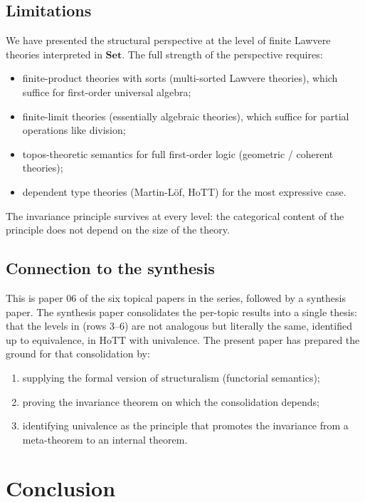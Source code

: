 \documentclass[12pt]{article}
\theoremstyle{definition}
\theoremstyle{remark}
\newcommand{\Set}{\mathbf{Set}}
\begin{document}
\subsection{Limitations}

We have presented the structural perspective at the level of finite Lawvere theories interpreted in $\Set$. The full strength of the perspective requires:
\begin{itemize}
  \item finite-product theories with sorts (multi-sorted Lawvere theories), which suffice for first-order universal algebra;
  \item finite-limit theories (essentially algebraic theories), which suffice for partial operations like division;
  \item topos-theoretic semantics for full first-order logic (geometric / coherent theories);
  \item dependent type theories (Martin-L\"of, HoTT) for the most expressive case.
\end{itemize}
The invariance principle survives at every level: the categorical content of the principle does not depend on the size of the theory.

\subsection{Connection to the synthesis}

This is paper $06$ of the six topical papers in the series, followed by a synthesis paper. The synthesis paper consolidates the per-topic results into a single thesis: that the levels in  (rows 3--6) are not analogous but literally the same, identified up to equivalence, in HoTT with univalence. The present paper has prepared the ground for that consolidation by:
\begin{enumerate}
  \item supplying the formal version of structuralism (functorial semantics);
  \item proving the invariance theorem on which the consolidation depends;
  \item identifying univalence as the principle that promotes the invariance from a meta-theorem to an internal theorem.
\end{enumerate}

\section{Conclusion}\label{sec:conclusion}
\end{document}
